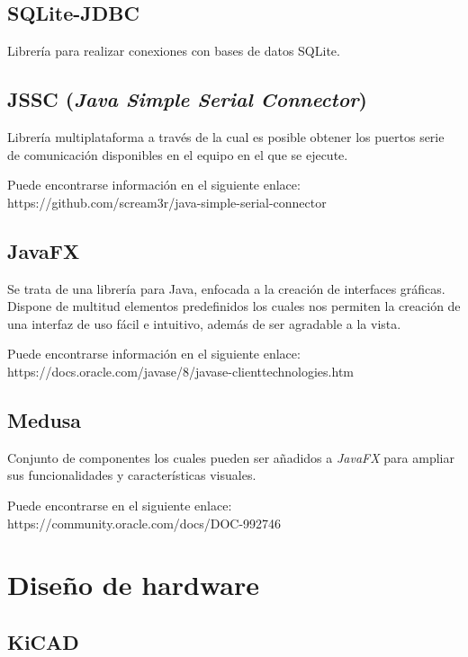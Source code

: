 \subsection{SQLite-JDBC}\label{sqlite-jdbc}

Librería para realizar conexiones con bases de datos SQLite.


\subsection{JSSC (\emph{Java Simple Serial Connector})}\label{jssc_java_simple_serial_connector}

Librería multiplataforma a través de la cual es posible obtener los puertos serie de comunicación disponibles en el equipo en el que se ejecute.

Puede encontrarse información en el siguiente enlace: https://github.com/scream3r/java-simple-serial-connector


\subsection{JavaFX}\label{javafx}
Se trata de una librería para Java, enfocada a la creación de interfaces gráficas. Dispone de multitud elementos predefinidos los cuales nos permiten la creación de una interfaz de uso fácil e intuitivo, además de ser agradable a la vista.

Puede encontrarse información en el siguiente enlace: https://docs.oracle.com/javase/8/javase-clienttechnologies.htm

\subsection{Medusa}\label{medusa}

Conjunto de componentes los cuales pueden ser añadidos a \emph{JavaFX} para ampliar sus funcionalidades y características visuales.

Puede encontrarse en el siguiente enlace: https://community.oracle.com/docs/DOC-992746


\section{Diseño de hardware}\label{diseño_de_hardware}

\subsection{KiCAD}\label{kicad}

